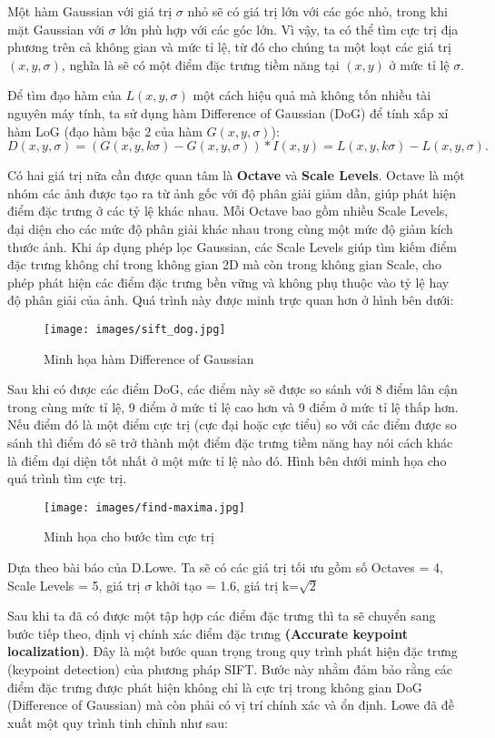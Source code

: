 Một hàm Gaussian với giá trị $\sigma$ nhỏ sẽ có giá trị lớn với các góc nhỏ, trong khi mặt Gaussian với $\sigma$ lớn phù hợp với các góc lớn. Vì vậy, ta có thể tìm cực trị địa phương trên cả không gian và mức tỉ lệ, từ đó cho chúng ta một loạt các giá trị $(x, y, \sigma)$, nghĩa là sẽ có một điểm đặc trưng tiềm năng tại $(x, y)$ ở mức tỉ lệ $\sigma$.

Để tìm đạo hàm của $L(x, y, \sigma)$ một cách hiệu quả mà không tốn nhiều tài nguyên máy tính, ta sử dụng hàm Difference of Gaussian (DoG) để tính xấp xỉ hàm LoG (đạo hàm bậc 2 của hàm $G(x, y, \sigma)$):
\[ D(x, y, \sigma) = (G(x, y, k\sigma) - G(x, y, \sigma)) \ast I(x, y)
= L(x, y, k\sigma) - L(x, y, \sigma). \]

Có hai giá trị nữa cần được quan tâm là \textbf{Octave} và \textbf{Scale Levels}. Octave là một nhóm các ảnh được tạo ra từ ảnh gốc với độ phân giải giảm dần, giúp phát hiện điểm đặc trưng ở các tỷ lệ khác nhau. Mỗi Octave bao gồm nhiều Scale Levels, đại diện cho các mức độ phân giải khác nhau trong cùng một mức độ giảm kích thước ảnh. Khi áp dụng phép lọc Gaussian, các Scale Levels giúp tìm kiếm điểm đặc trưng không chỉ trong không gian 2D mà còn trong không gian Scale, cho phép phát hiện các điểm đặc trưng bền vững và không phụ thuộc vào tỷ lệ hay độ phân giải của ảnh. Quá trình này được minh trực quan hơn ở hình bên dưới:
\begin{figure}[H]
	\centering
	\texttt{[image: images/sift\_dog.jpg]}
	\caption{Minh họa hàm Difference of Gaussian}
\end{figure}

Sau khi có được các điểm DoG, các điểm này sẽ được so sánh với 8 điểm lân cận trong cùng mức tỉ lệ, 9 điểm ở mức tỉ lệ cao hơn và 9 điểm ở mức tỉ lệ thấp hơn. Nếu điểm đó là một điểm cực trị (cực đại hoặc cực tiểu) so với các điểm được so sánh thì điểm đó sẽ trở thành một điểm đặc trưng tiềm năng hay nói cách khác là điểm đại diện tốt nhất ở một mức tỉ lệ nào đó. Hình bên dưới minh họa cho quá trình tìm cực trị.
\begin{figure}[H]
	\centering
	\texttt{[image: images/find-maxima.jpg]}
	\caption{Minh họa cho bước tìm cực trị}
\end{figure}
Dựa theo bài báo của D.Lowe. Ta sẽ có các giá trị tối ưu gồm số Octaves = 4, Scale Levels = 5, giá trị $\sigma$ khởi tạo = 1.6, giá trị k=$\sqrt{2}$

Sau khi ta đã có được một tập hợp các điểm đặc trưng thì ta sẽ chuyển sang bước tiếp theo, định vị chính xác điểm đặc trưng \textbf{(Accurate keypoint localization)}. Đây là một bước quan trọng trong quy trình phát hiện đặc trưng (keypoint detection) của phương pháp SIFT. Bước này nhằm đảm bảo rằng các điểm đặc trưng được phát hiện không chỉ là cực trị trong không gian DoG (Difference of Gaussian) mà còn phải có vị trí chính xác và ổn định. Lowe đã đề xuất một quy trình tinh chỉnh như sau:\\

